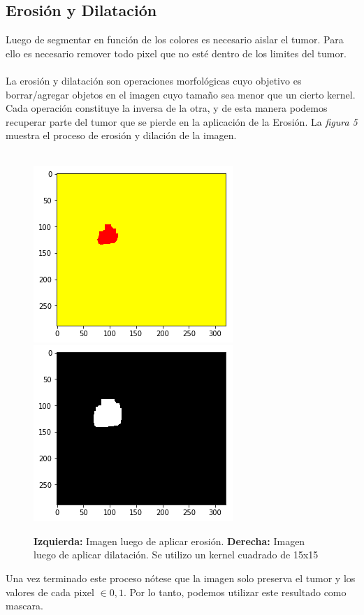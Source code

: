 \documentclass[conference]{IEEEtran}
\begin{document}
\subsection{Erosión y Dilatación}
Luego de segmentar en función de los colores es necesario aislar el tumor. Para ello es necesario remover todo pixel que no esté dentro de los limites del tumor.\\\\La erosión y dilatación son operaciones morfológicas cuyo objetivo es borrar/agregar objetos en el imagen cuyo tamaño sea menor que un cierto kernel. Cada operación constituye la inversa de la otra, y de esta manera podemos recuperar parte del tumor que se pierde en la aplicación de la Erosión. La \textit{figura 5} muestra el proceso de erosión y dilación de la imagen.\\\\
\begin{figure}
\begin{center}
\includegraphics[scale=0.4]{img/erosion.png} 
\includegraphics[scale=0.4]{img/dilation.png} 
\end{center}
\caption{\textbf{Izquierda:} Imagen luego de aplicar erosión. \textbf{Derecha:} Imagen luego de aplicar dilatación. Se utilizo un kernel cuadrado de 15x15}
\end{figure}
Una vez terminado este proceso nótese que la imagen solo preserva el tumor y los valores de cada pixel $\in {0,1}$. Por lo tanto, podemos utilizar este resultado como mascara.
\end{document}
